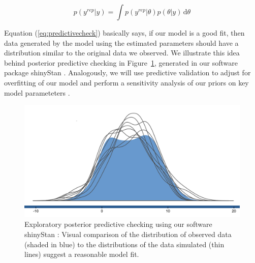 \documentclass[11pt,notitlepage]{article}
\begin{document}
\begin{figure}
\begin{equation} \label{eq:predictivecheck}
 p(y^{rep}|y)  = \int \! p(y^{rep}|\theta) p(\theta|y) \, \mathrm{d}\theta 
\end{equation}
\end{figure}

Equation (\ref{eq:predictivecheck}) basically says, if our model is a good fit, then data generated by the model using the estimated parameters should have a distribution similar to the original data we observed.  We illustrate this idea behind posterior predictive checking \cite{Gelman_predictive_2000} in Figure~\ref{fig:posteriorpredictivecheck}, generated in our software package shinyStan \cite{shinystan-software:2015}. Analogously, we will use predictive validation to adjust for overfitting of our model and perform a sensitivity analysis of our priors on key model parameteters \cite{Gelman-Hill_2014,Gelman_predictive_2000}.

\begin{figure} 
 \vspace{-10pt}
 \includegraphics[scale=0.21]{Figures/posteriorpredictivecheck.png} 
  \caption{\footnotesize Exploratory posterior predictive checking using our software shinyStan \cite{shinystan-software:2015}: Visual comparison of the distribution of observed data (shaded in blue) to the distributions of the data simulated (thin lines) suggest a reasonable model fit.}
  \label{fig:posteriorpredictivecheck}
\end{figure}
\end{document}
